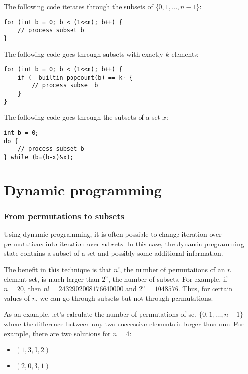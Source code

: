 The following code iterates through
the subsets of $\{0,1,\ldots,n-1\}$:

\begin{lstlisting}
for (int b = 0; b < (1<<n); b++) {
    // process subset b
}
\end{lstlisting}
The following code goes through
subsets with exactly $k$ elements:
\begin{lstlisting}
for (int b = 0; b < (1<<n); b++) {
    if (__builtin_popcount(b) == k) {
        // process subset b
    }
}
\end{lstlisting}
The following code goes through the subsets
of a set $x$:
\begin{lstlisting}
int b = 0;
do {
    // process subset b
} while (b=(b-x)&x);
\end{lstlisting}

\section{Dynamic programming}

\subsubsection{From permutations to subsets}

Using dynamic programming, it is often possible
to change iteration over permutations into
iteration over subsets.
In this case, the dynamic programming state
contains a subset of a set and possibly
some additional information.

The benefit in this technique is that
$n!$, the number of permutations of an $n$ element set,
is much larger than $2^n$, the number of subsets.
For example, if $n=20$, then
$n!=2432902008176640000$ and $2^n=1048576$.
Thus, for certain values of $n$,
we can go through subsets but not through permutations.

As an example, let's calculate the number of
permutations of set $\{0,1,\ldots,n-1\}$
where the difference between any two successive
elements is larger than one.
For example, there are two solutions for $n=4$:
\begin{itemize}
\item $(1,3,0,2)$
\item $(2,0,3,1)$
\end{itemize}

